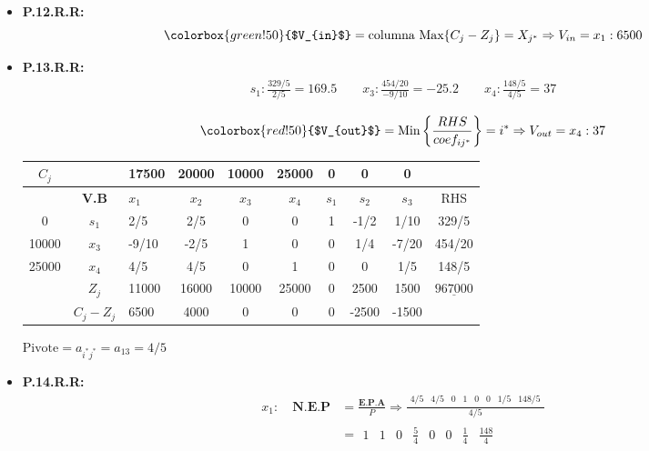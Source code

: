 \documentclass{templateNote}
\begin{document}
\begin{itemize}
    \item \textbf{P.12.R.R:}
    \begin{equation*}
        \colorbox{green!50}{$V_{in}$} = \text{columna Max} \{C_j-Z_j\} = X_{j^*} \Rightarrow V_{in} = x_1 : 6500
    \end{equation*}

    \item \textbf{P.13.R.R:}
    \begin{align*}
        s_1: \frac{329/5}{2/5} = 169.5 \qquad x_3: \frac{454/20}{-9/10} = -25.2 \qquad x_4: \frac{148/5}{4/5} = 37 \\
    \end{align*}
    \begin{equation*}
        \colorbox{red!50}{$V_{out}$} = \text{Min} \left\{ \frac{RHS}{coef_{ij^*}} \right\} = i^* \Rightarrow V_{out} = x_4 : 37
    \end{equation*}

    \begin{center}
        \begin{tabular}{|c|c|g|c|c|c|c|c|c|c|}
            \hline
            $C_j$ & & 17500 & 20000 & 10000 & 25000 & 0 & 0 & 0 & \\ \hline
            & \textbf{V.B} & $x_1$ & $x_2$ & $x_3$ & $x_4$ & $s_1$ & $s_2$ & $s_3$ & RHS \\  & $s_1$ & 2/5 & 2/5 & 0 & 0 & 1 & -1/2 & 1/10 & 329/5 \\
            10000 & $x_3$ & -9/10 & -2/5 & 1 & 0 & 0 & 1/4 & -7/20 & 454/20 \\
            25000 & $x_4$ & 4/5 & 4/5 & 0 & 1 & 0 & 0 & 1/5 & 148/5 \\ \hline
            & $Z_j$ & 11000 & 16000 & 10000 & 25000 & 0 & 2500 & 1500 & $\underline{967000}$ \\ \hline
            & $C_j - Z_j$ & 6500 & 4000 & 0 & 0 & 0 & -2500 & -1500 & \\ \hline
        \end{tabular}
    \end{center}
    \begin{center}
        $\text{Pivote} = a_{i^*j^*} = a_{13} = 4/5$
    \end{center}

    \item \textbf{P.14.R.R:}
    \begin{align*}
        x_1: \quad \textbf{N.E.P} &= \frac{\textbf{E.P.A}}{P} \Rightarrow \frac{\begin{array}{cccccccc} 4/5 & 4/5 & 0 & 1 & 0 & 0 & 1/5 & 148/5\end{array}}{4/5} \\
        &= \begin{array}{cccccccc} 1 & 1 & 0 & \frac{5}{4} & 0 & 0 & \frac{1}{4} & \frac{148}{4}\end{array}
    \end{align*}


\end{itemize}
\end{document}

